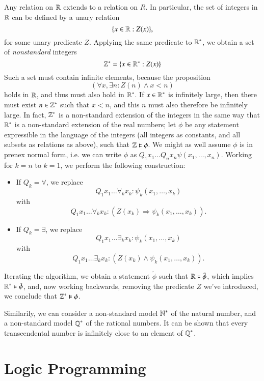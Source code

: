 Any relation on $\operatorname{\mathbb{R}}$ extends to a relation on $R$. In particular, the set of integers in $\operatorname{\mathbb{R}}$ can be defined by a unary relation
%
\[ \{ x \in \operatorname{\mathbb{R}}: Z(x) \}, \]
%
for some unary predicate $Z$. Applying the same predicate to $\operatorname{\mathbb{R}}^*$, we obtain a set of \emph{nonstandard} integers 
%
\[ \operatorname{\mathbb{Z}}^* = \{ x \in \operatorname{\mathbb{R}}^*: Z(x) \} \]
%
Such a set must contain infinite elements, because the proposition
%
\[ (\forall x, \exists n: Z(n) \wedge x < n) \]
%
holds in $\operatorname{\mathbb{R}}$, and thus must also hold in $\operatorname{\mathbb{R}}^*$. If $x \in \operatorname{\mathbb{R}}^*$ is infinitely large, then there must exist $n \in \operatorname{\mathbb{Z}}^*$ such that $x < n$, and this $n$ must also therefore be infinitely large. In fact, $\operatorname{\mathbb{Z}}^*$ is a non-standard extension of the integers in the same way that $\operatorname{\mathbb{R}}^*$ is a non-standard extension of the real numbers; let $\phi$ be any statement expressible in the language of the integers (all integers as constants, and all subsets as relations as above), such that $\operatorname{\mathbb{Z}} \vDash \phi$. We might as well assume $\phi$ is in prenex normal form, i.e. we can write $\phi$ as $Q_1 x_1 \dots Q_n x_n \psi(x_1,\dots,x_n)$. Working for $k = n$ to $k = 1$, we perform the following construction:
%
\begin{itemize}
    \item If $Q_k = \forall$, we replace
    \[ Q_1 x_1 \dots \forall_k x_k : \psi_k(x_1,\dots,x_k) \]
    with
    \[ Q_1 x_1 \dots \forall_k x_k : ( Z(x_k) \Rightarrow \psi_k(x_1,\dots,x_k) ). \]

    \item If $Q_k = \exists$, we replace
    \[ Q_1 x_1 \dots \exists_k x_k : \psi_k(x_1,\dots,x_k) \]
    with
    \[ Q_1 x_1 \dots \exists_k x_k : ( Z(x_k) \wedge \psi_k(x_1,\dots,x_k) ). \]
\end{itemize}
%
Iterating the algorithm, we obtain a statement $\tilde{\phi}$ such that $\operatorname{\mathbb{R}} \vDash \tilde{\phi}$, which implies $\operatorname{\mathbb{R}}^* \vDash \tilde{\phi}$, and, now working backwards, removing the predicate $Z$ we've introduced, we conclude that $\operatorname{\mathbb{Z}}^* \vDash \phi$.

\begin{remark}
    Similarily, we can consider a non-standard model $\operatorname{\mathbb{N}}^*$ of the natural number, and a non-standard model $\operatorname{\mathbb{Q}}^*$ of the rational numbers. It can be shown that every transcendental number is infinitely close to an element of $\operatorname{\mathbb{Q}}^*$.
\end{remark}






\section{Logic Programming}

